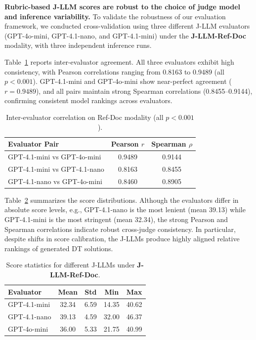 \noindent\textbf{Rubric-based J-LLM scores are robust to the choice of judge model and inference variability.}
To validate the robustness of our evaluation framework, we conducted cross-validation using three different J-LLM evaluators (GPT-4o-mini, GPT-4.1-nano, and GPT-4.1-mini) under the \textbf{J-LLM-Ref-Doc} modality, with three independent inference runs.

Table~\ref{tab:jllm_correlation} reports inter-evaluator agreement. All three evaluators exhibit high consistency, with Pearson correlations ranging from 0.8163 to 0.9489 (all $p < 0.001$). GPT-4.1-mini and GPT-4o-mini show near-perfect agreement ($r = 0.9489$), and all pairs maintain strong Spearman correlations (0.8455--0.9144), confirming consistent model rankings across evaluators.

\begin{table}[htbp]
\centering
\caption{Inter-evaluator correlation on Ref-Doc modality (all $p < 0.001$).}
\label{tab:jllm_correlation}
\begin{tabular}{lcc}
\toprule
\textbf{Evaluator Pair} & \textbf{Pearson $r$} & \textbf{Spearman $\rho$} \\
\midrule
GPT-4.1-mini vs GPT-4o-mini & 0.9489 & 0.9144 \\
GPT-4.1-mini vs GPT-4.1-nano & 0.8163 & 0.8455 \\
GPT-4.1-nano vs GPT-4o-mini & 0.8460 & 0.8905 \\
\bottomrule
\end{tabular}
\end{table}

Table~\ref{tab:jllm_statistics} summarizes the score distributions. Although the evaluators differ in absolute score levels, e.g., GPT-4.1-nano is the most lenient (mean 39.13) while GPT-4.1-mini is the most stringent (mean 32.34), the strong Pearson and Spearman correlations indicate robust cross-judge consistency. In particular, despite shifts in score calibration, the J-LLMs produce highly aligned relative rankings of generated DT solutions.

\begin{table}[htbp]
\centering
\caption{Score statistics for different J-LLMs under \textbf{J-LLM-Ref-Doc}.}
\label{tab:jllm_statistics}
\begin{tabular}{lcccc}
\toprule
\textbf{Evaluator} & \textbf{Mean} & \textbf{Std} & \textbf{Min} & \textbf{Max} \\
\midrule
GPT-4.1-mini & 32.34 & 6.59 & 14.35 & 40.62 \\
GPT-4.1-nano & 39.13 & 4.59 & 32.00 & 46.37 \\
GPT-4o-mini  & 36.00 & 5.33 & 21.75 & 40.99 \\
\bottomrule
\end{tabular}
\end{table}

